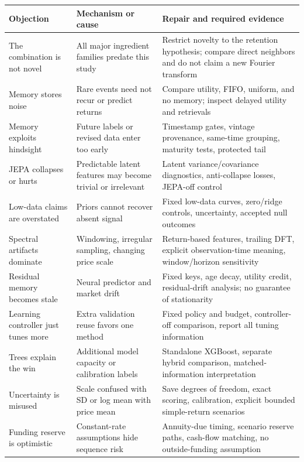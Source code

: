\documentclass[11pt,a4paper]{article}
\begin{document}
\begin{longtable}{>{\raggedright\arraybackslash}p{.23\linewidth}>{\raggedright\arraybackslash}p{.31\linewidth}>{\raggedright\arraybackslash}p{.37\linewidth}}
\toprule Objection & Mechanism or cause & Repair and required evidence \\
\midrule\endhead
The combination is not novel & All major ingredient families predate this study & Restrict novelty to the retention hypothesis; compare direct neighbors and do not claim a new Fourier transform \\
Memory stores noise & Rare events need not recur or predict returns & Compare utility, FIFO, uniform, and no memory; inspect delayed utility and retrievals \\
Memory exploits hindsight & Future labels or revised data enter too early & Timestamp gates, vintage provenance, same-time grouping, maturity tests, protected tail \\
JEPA collapses or hurts & Predictable latent features may become trivial or irrelevant & Latent variance/covariance diagnostics, anti-collapse losses, JEPA-off control \\
Low-data claims are overstated & Priors cannot recover absent signal & Fixed low-data curves, zero/ridge controls, uncertainty, accepted null outcomes \\
Spectral artifacts dominate & Windowing, irregular sampling, changing price scale & Return-based features, trailing DFT, explicit observation-time meaning, window/horizon sensitivity \\
Residual memory becomes stale & Neural predictor and market drift & Fixed keys, age decay, utility credit, residual-drift analysis; no guarantee of stationarity \\
Learning controller just tunes more & Extra validation reuse favors one method & Fixed policy and budget, controller-off comparison, report all tuning information \\
Trees explain the win & Additional model capacity or calibration labels & Standalone XGBoost, separate hybrid comparison, matched-information interpretation \\
Uncertainty is misused & Scale confused with SD or log mean with price mean & Save degrees of freedom, exact scoring, calibration, explicit bounded simple-return scenarios \\
Funding reserve is optimistic & Constant-rate assumptions hide sequence risk & Annuity-due timing, scenario reserve paths, cash-flow matching, no outside-funding assumption \\

\end{longtable}
\end{document}
